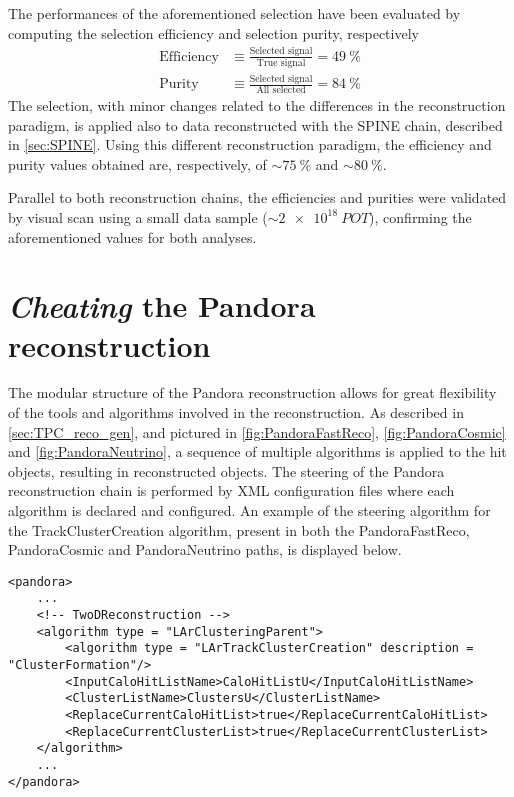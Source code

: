 The performances of the aforementioned selection have been  evaluated \cite{artero_pons_2024_13841852, particles8010018} by computing the selection efficiency and selection purity, respectively \begin{equation}
    \begin{aligned}
        \mathrm{Efficiency} &\equiv \frac{\text{Selected signal}}{\text{True signal}} = \SI{49}{\percent} \\
        \mathrm{Purity} &\equiv \frac{\text{Selected signal}}{\text{All selected}} = \SI{84}{\percent}
    \end{aligned}
\end{equation} The selection, with minor changes related to the differences in the reconstruction paradigm, is applied also to data reconstructed with the SPINE chain, described in \autoref{sec:SPINE}. Using this different reconstruction paradigm, the efficiency and purity values obtained are, respectively, of $\sim\SI{75}{\percent}$ and $\sim\SI{80}{\percent}$. 

Parallel to both reconstruction chains, the efficiencies and purities were validated by visual scan using a small data sample ($\sim\SI{2e18}{POT}$), confirming the aforementioned values for both analyses. 

\section{\emph{Cheating} the Pandora reconstruction} 

The modular structure of the Pandora reconstruction allows for great flexibility of the tools and algorithms involved in the reconstruction. As described in \autoref{sec:TPC_reco_gen}, and pictured in \autoref{fig:PandoraFastReco}, \ref{fig:PandoraCosmic} and \ref{fig:PandoraNeutrino}, a sequence of multiple algorithms is applied to the hit objects, resulting in reconstructed objects. The steering of the Pandora reconstruction chain is performed by XML configuration files where each algorithm is declared and configured. An example of the steering algorithm for the TrackClusterCreation algorithm, present in both the PandoraFastReco, PandoraCosmic and PandoraNeutrino paths, is displayed below.

\begin{lstlisting}[style=xmlstyle]
<pandora>
    ...
    <!-- TwoDReconstruction -->
    <algorithm type = "LArClusteringParent">
        <algorithm type = "LArTrackClusterCreation" description = "ClusterFormation"/>
        <InputCaloHitListName>CaloHitListU</InputCaloHitListName>
        <ClusterListName>ClustersU</ClusterListName>
        <ReplaceCurrentCaloHitList>true</ReplaceCurrentCaloHitList>
        <ReplaceCurrentClusterList>true</ReplaceCurrentClusterList>
    </algorithm>
    ...
</pandora>
\end{lstlisting}

